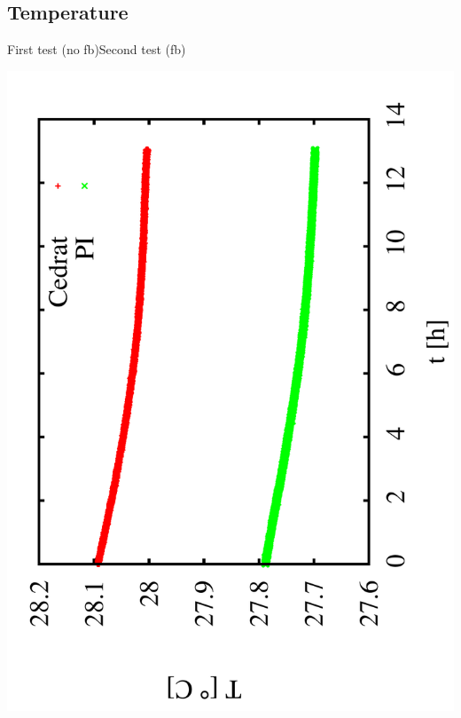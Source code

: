 \documentclass[a4paper,11pt]{book}
\begin{document}
\subsection{Temperature}
\hspace*{1.2cm}First test (no fb)\hspace{2cm}Second test (fb)\par
 \includegraphics[angle=-90,scale=0.18]{image_ai_31a.pdf}
\end{document}
